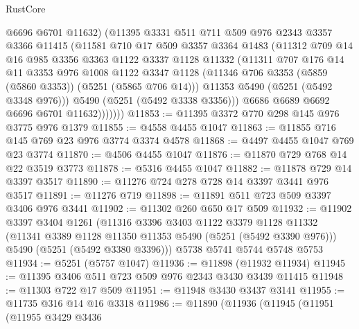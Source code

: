 \begin{lexlean}{RustCore}
\begin{coremodule}
                @6696
                @6701
                @11632)
              (@11395
                @3331
                @511
                @711
                @509
                @976
                @2343
                @3357
                @3366
                @11415
                (@11581
                  @710
                  @17
                  @509
                  @3357
                  @3364
                  @1483
                  (@11312
                    @709
                    @14
                    @16
                    @985
                    @3356
                    @3363
                    @1122
                    @3337
                    @1128
                    @11332
                    (@11311
                      @707
                      @176
                      @14
                      @11
                      @3353
                      @976
                      @1008
                      @1122
                      @3347
                      @1128
                      (@11346 @706 @3353 (@5859 (@5860 @3353)) (@5251 (@5865 @706 @14)))
                      @11353
                      @5490
                      (@5251 (@5492 @3348 @976)))
                    @5490
                    (@5251 (@5492 @3338 @3356)))
                  @6686
                  @6689
                  @6692
                  @6696
                  @6701
                  @11632)))))))
@11853 := @11395 @3372 @770 @298 @145 @976 @3775 @976 @1379
@11855 := @4558 @4455 @1047
@11863 := @11855 @716 @145 @769 @23 @976 @3774 @3374 @4578
@11868 := @4497 @4455 @1047 @769 @23 @3774
@11870 := @4506 @4455 @1047
@11876 := @11870 @729 @768 @14 @22 @3519 @3773
@11878 := @5316 @4455 @1047
@11882 := @11878 @729 @14 @3397 @3517
@11890 := @11276 @724 @278 @728 @14 @3397 @3441 @976 @3517
@11891 := @11276 @719
@11898 := @11891 @511 @723 @509 @3397 @3406 @976 @3441
@11902 := @11302 @260 @650 @17 @509
@11932 := @11902
    @3397
    @3404
    @1261
    (@11316
      @3396
      @3403
      @1122
      @3379
      @1128
      @11332
      (@11341 @3389 @1128 @11350 @11353 @5490 (@5251 (@5492 @3390 @976)))
      @5490
      (@5251 (@5492 @3380 @3396)))
    @5738
    @5741
    @5744
    @5748
    @5753
@11934 := @5251 (@5757 @1047)
@11936 := @11898 (@11932 @11934)
@11945 := @11395 @3406 @511 @723 @509 @976 @2343 @3430 @3439 @11415
@11948 := @11303 @722 @17 @509
@11951 := @11948 @3430 @3437 @3141
@11955 := @11735 @316 @14 @16 @3318
@11986 := @11890
    (@11936
      (@11945
        (@11951
          (@11955
            @3429
            @3436

\end{coremodule}
\end{lexlean}
